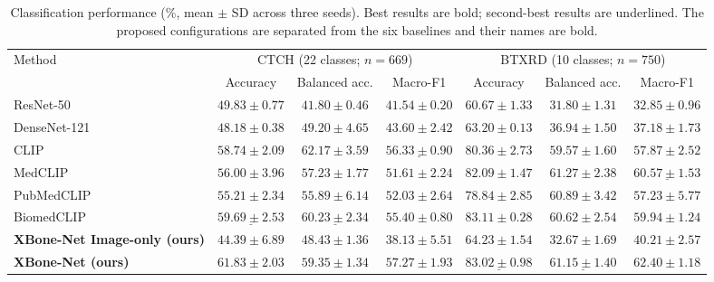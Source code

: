 \begin{table}[t]
\caption{Classification performance (\%, mean $\pm$ SD across three seeds). Best results are bold; second-best results are underlined. The proposed configurations are separated from the six baselines and their names are bold.}
\label{tab:classification}
\centering\footnotesize
\setlength{\tabcolsep}{6pt}
\begin{tabular*}{\textwidth}{@{\extracolsep{\fill}}lcccccc@{}}
\toprule
Method & \multicolumn{3}{c}{CTCH (22 classes; $n=669$)} & \multicolumn{3}{c}{BTXRD (10 classes; $n=750$)} \\
\cmidrule(lr){2-4}\cmidrule(l){5-7}
 & Accuracy & Balanced acc. & Macro-F1 & Accuracy & Balanced acc. & Macro-F1 \\
\midrule
ResNet-50 & $49.83\pm0.77$ & $41.80\pm0.46$ & $41.54\pm0.20$ & $60.67\pm1.33$ & $31.80\pm1.31$ & $32.85\pm0.96$ \\
DenseNet-121 & $48.18\pm0.38$ & $49.20\pm4.65$ & $43.60\pm2.42$ & $63.20\pm0.13$ & $36.94\pm1.50$ & $37.18\pm1.73$ \\
CLIP & $58.74\pm2.09$ & $\mathbf{62.17\pm3.59}$ & $\underline{56.33\pm0.90}$ & $80.36\pm2.73$ & $59.57\pm1.60$ & $57.87\pm2.52$ \\
MedCLIP & $56.00\pm3.96$ & $57.23\pm1.77$ & $51.61\pm2.24$ & $82.09\pm1.47$ & $\mathbf{61.27\pm2.38}$ & $\underline{60.57\pm1.53}$ \\
PubMedCLIP & $55.21\pm2.34$ & $55.89\pm6.14$ & $52.03\pm2.64$ & $78.84\pm2.85$ & $60.89\pm3.42$ & $57.23\pm5.77$ \\
BiomedCLIP & $\underline{59.69\pm2.53}$ & $\underline{60.23\pm2.34}$ & $55.40\pm0.80$ & $\mathbf{83.11\pm0.28}$ & $60.62\pm2.54$ & $59.94\pm1.24$ \\
\midrule
\textbf{XBone-Net Image-only (ours)} & $44.39\pm6.89$ & $48.43\pm1.36$ & $38.13\pm5.51$ & $64.23\pm1.54$ & $32.67\pm1.69$ & $40.21\pm2.57$ \\
\textbf{XBone-Net (ours)} & $\mathbf{61.83\pm2.03}$ & $59.35\pm1.34$ & $\mathbf{57.27\pm1.93}$ & $\underline{83.02\pm0.98}$ & $\underline{61.15\pm1.40}$ & $\mathbf{62.40\pm1.18}$ \\
\bottomrule
\end{tabular*}
\end{table}
